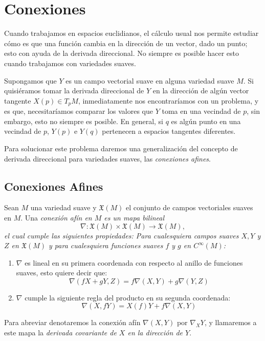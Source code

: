 \section{Conexiones}\label{Sección: Conexiones}
Cuando trabajamos en espacios euclidianos, el cálculo usual nos permite estudiar cómo es que una función cambia en la dirección de un vector, dado un punto; esto con ayuda de la derivada direccional. No siempre es posible hacer esto cuando trabajamos con variedades suaves.

Supongamos que $Y$ es un campo vectorial suave en alguna variedad suave $M$. Si quisiéramos tomar la derivada direccional de $Y$ en la dirección de algún vector tangente $X(p) \in T_{p}M$, inmediatamente nos encontraríamos con un problema, y es que, necesitaríamos comparar los valores que $Y$ toma en una vecindad de $p$, sin embargo, esto no siempre es posible. En general, si $q$ es algún punto en una vecindad de $p$, $Y(p)$ e $Y(q)$ pertenecen a espacios tangentes diferentes.

Para solucionar este problema daremos una generalización del concepto de derivada direccional para variedades suaves, las \textit{conexiones afines}.

\subsection{Conexiones Afines}\label{Subsección: Conexiones Afines}
\begin{definition}
	Sean $M$ una variedad suave y $\mathfrak{X}(M)$ el conjunto de campos vectoriales suaves en $M$. Una \it{conexión afín en $M$} es un mapa bilineal
	\[ \nabla: \mathfrak{X}(M) \times \mathfrak{X}(M) \to \mathfrak{X}(M), \]
	el cual cumple las siguientes propiedades: Para cualesquiera campos suaves $X, Y$ y $Z$ en $\mathfrak{X}(M)$ y para cualesquiera funciones suaves $f$ y $g$ en $C^{\infty}(M)$:
	\begin{enumerate}
		\item $\nabla$ es lineal en su primera coordenada con respecto al anillo de funciones suaves, esto quiere decir que:
		      \[
			      \nabla(fX + gY, Z) = f \nabla(X,Y) + g \nabla(Y,Z)
		      \]
		\item $\nabla$ cumple la siguiente regla del producto en su segunda coordenada:
		      \[
			      \nabla(X,fY) = X(f)Y + f \nabla(X,Y)
		      \]
	\end{enumerate}
	Para abreviar denotaremos la conexión afín $\nabla(X,Y)$ por $\nabla_{X}Y$, y llamaremos a este mapa la \textit{derivada covariante de $X$ en la dirección de $Y$}.
\end{definition}


